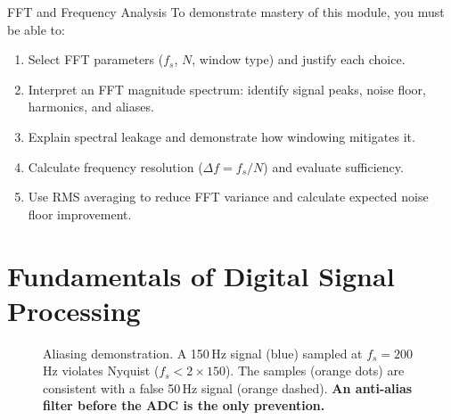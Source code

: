 \documentclass[11pt,letterpaper,twoside,openany]{book}
\begin{document}

\begin{masterycheckbox}{FFT and Frequency Analysis}
To demonstrate mastery of this module, you must be able to:
\begin{enumerate}[nosep,leftmargin=1.5em]
\item Select FFT parameters ($f_s$, $N$, window type) and justify each choice.
\item Interpret an FFT magnitude spectrum: identify signal peaks, noise floor, harmonics, and aliases.
\item Explain spectral leakage and demonstrate how windowing mitigates it.
\item Calculate frequency resolution ($\Delta f = f_s/N$) and evaluate sufficiency.
\item Use RMS averaging to reduce FFT variance and calculate expected noise floor improvement.
\end{enumerate}
\end{masterycheckbox}

\chapter{Fundamentals of Digital Signal Processing}
\label{ch:dsp}

\begin{figure}[htbp]
\centering
{}
\caption{Aliasing demonstration. A 150\,Hz signal (blue) sampled at $f_s = 200$\,Hz violates Nyquist ($f_s < 2 \times 150$). The samples (orange dots) are consistent with a false 50\,Hz signal (orange dashed). \textbf{An anti-alias filter before the ADC is the only prevention.}}
\label{fig:aliasing}
\end{figure}
\end{document}
